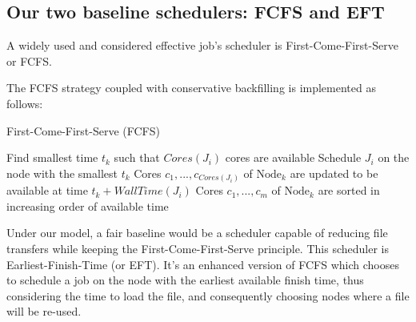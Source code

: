 \documentclass[conference,10pt]{IEEEtran}
\newcommand{\Node}[1]{\ensuremath{\mathrm{Node}_{#1}}\xspace}
\newcommand{\core}{\mathit{Cores}\xspace}
\newcommand{\walltime}{\mathit{WallTime}\xspace}
\newcommand{\nodeset}{\ensuremath{\mathbb{N}}\xspace}
\begin{document}
\subsection{Our two baseline schedulers: FCFS and EFT}\label{subsec.fcfs_eft}

A widely used and considered effective job's scheduler is 
First-Come-First-Serve or FCFS.


The FCFS strategy coupled with conservative backfilling is implemented as follows:	
\begin{algorithm*}[htb]%
\caption{First-Come-First-Serve (FCFS)}\label{algo.fcfs}
\begin{algorithmic}[1]
	 
		\ForEach{$\Node{k} \in \nodeset$}
			\State Find smallest time $t_k$ such that $\core(J_i)$ cores are available
		\EndFor
		\State Schedule $J_i$ on the node with the smallest $t_k$
		\State Cores $c_1, ..., c_{\core(J_i)}$ of $\Node{k}$ are updated to be available at time $t_k + \walltime(J_i)$
		\State Cores $c_1, ..., c_m$ of $\Node{k}$ are sorted in increasing order of available time 
	\EndFor
	\end{algorithmic}
\end{algorithm*}

Under our model, a fair baseline would be a scheduler capable
of reducing file transfers while keeping the First-Come-First-Serve
principle. This scheduler is Earliest-Finish-Time (or EFT).
It's an enhanced version of FCFS which chooses to schedule a job
on the node with the earliest available finish time, thus considering
the time to load the file, and consequently choosing nodes where a file will
be re-used. 
		
\end{document}
